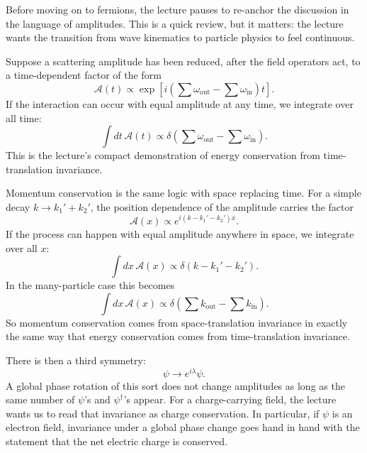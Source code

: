 Before moving on to fermions, the lecture pauses to re-anchor the discussion in the language of amplitudes. This is a quick review, but it matters: the lecture wants the transition from wave kinematics to particle physics to feel continuous.

Suppose a scattering amplitude has been reduced, after the field operators act, to a time-dependent factor of the form
\begin{equation}
\mathcal{A}(t)\propto
\exp\!\left[
i\left(
\sum \omega_{\mathrm{out}}-\sum \omega_{\mathrm{in}}
\right)t
\right].
\end{equation}
If the interaction can occur with equal amplitude at any time, we integrate over all time:
\begin{equation}
\int dt\,\mathcal{A}(t)\propto
\delta\!\left(
\sum \omega_{\mathrm{out}}-\sum \omega_{\mathrm{in}}
\right).
\end{equation}
This is the lecture's compact demonstration of energy conservation from time-translation invariance.

Momentum conservation is the same logic with space replacing time. For a simple decay \(k\to k_1'+k_2'\), the position dependence of the amplitude carries the factor
\begin{equation}
\mathcal{A}(x)\propto e^{i(k-k_1'-k_2')x}.
\end{equation}
If the process can happen with equal amplitude anywhere in space, we integrate over all \(x\):
\begin{equation}
\int dx\,\mathcal{A}(x)\propto \delta(k-k_1'-k_2').
\end{equation}
In the many-particle case this becomes
\begin{equation}
\int dx\,\mathcal{A}(x)\propto
\delta\!\left(
\sum k_{\mathrm{out}}-\sum k_{\mathrm{in}}
\right).
\end{equation}
So momentum conservation comes from space-translation invariance in exactly the same way that energy conservation comes from time-translation invariance.

There is then a third symmetry:
\begin{equation}
\psi\longrightarrow e^{i\lambda}\psi.
\end{equation}
A global phase rotation of this sort does not change amplitudes as long as the same number of \(\psi\)'s and \(\psi^\dagger\)'s appear. For a charge-carrying field, the lecture wants us to read that invariance as charge conservation. In particular, if \(\psi\) is an electron field, invariance under a global phase change goes hand in hand with the statement that the net electric charge is conserved.

